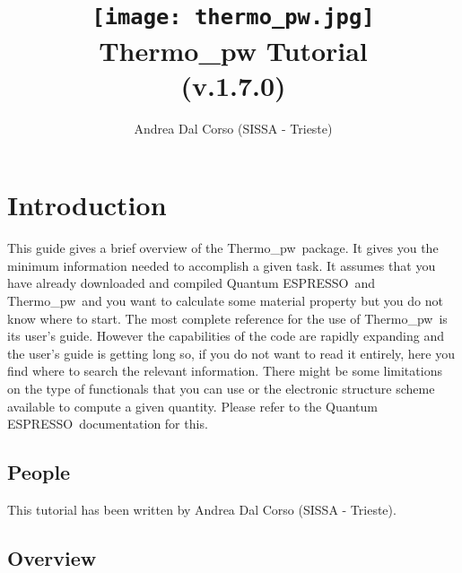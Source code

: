 \documentclass[12pt,a4paper,twoside]{report}
\def\version{1.7.0}
\def\qe{{\sc Quantum ESPRESSO}}
\def\thermo{{\sc Thermo}\_{\sc pw}}
\begin{document}
 

\author{Andrea Dal Corso (SISSA - Trieste)}
\date{}

\title{
  \texttt{[image: thermo\_pw.jpg]} \\
  \vspace{3truecm}
  \Huge \color{dark-blue} {\sc Thermo}\_{\sc pw} Tutorial \\ (v.\version)
}

\maketitle

\newpage

\tableofcontents

\newpage

{\color{dark-blue}\chapter*{Introduction}}
\color{black}

This guide gives a brief overview of the \thermo\ package. 
It gives you the minimum information needed to accomplish a given task.
It assumes that you have already downloaded and compiled \qe\ and \thermo\  
and you want to calculate some material property but you do not know where 
to start. 
The most complete reference for the use of \thermo\ is its user's guide.
However the capabilities of the code are rapidly expanding and the 
user's guide is getting long so, if you do not want
to read it entirely, here you find where to search the relevant information. 
There might be some limitations on the type of functionals that you can use 
or the electronic structure scheme available to compute a given quantity.
Please refer to the \qe\ documentation for this.

\newpage

{\color{coral}\section{People}}
\color{black}
This tutorial has been written by Andrea Dal Corso (SISSA - Trieste). 

\newpage

{\color{coral}\section{Overview}}
\color{black}
\end{document}
